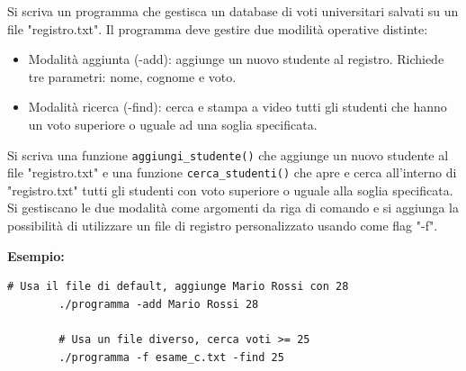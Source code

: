 \begin{Exercise}[label={ex:voti}]
    Si scriva un programma che gestisca un database di voti universitari salvati su un file "registro.txt".
    Il programma deve gestire due modilità operative distinte:
    \begin{itemize}
        \item Modalità aggiunta (-add): aggiunge un nuovo studente al registro. Richiede tre parametri: nome, cognome e voto. 
        \item Modalità ricerca (-find): cerca e stampa a video tutti gli studenti che hanno un voto superiore o uguale ad una soglia specificata.
    \end{itemize}

    Si scriva una funzione \texttt{aggiungi\_studente()} che aggiunge un nuovo studente al file "registro.txt" 
    e una funzione \texttt{cerca\_studenti()} che apre e cerca all'interno di "registro.txt" 
    tutti gli studenti con voto superiore o uguale alla soglia specificata. Si gestiscano le due modalità come
    argomenti da riga di comando e si aggiunga la possibilità di utilizzare un file di registro personalizzato usando come flag "-f".

    \textbf{Esempio:}
    \begin{lstlisting}[style=console]
        # Usa il file di default, aggiunge Mario Rossi con 28
        ./programma -add Mario Rossi 28

        # Usa un file diverso, cerca voti >= 25
        ./programma -f esame_c.txt -find 25
    \end{lstlisting}
    
\end{Exercise}

\begin{Answer}[ref={ex:voti}]
  	
\end{Answer}